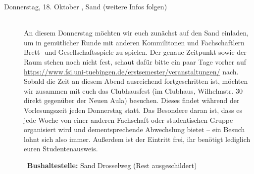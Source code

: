 \begin{description}
\item[Donnerstag, 18. Oktober \Jahr,  Sand (weitere Infos folgen)]\ \\
An diesem Donnerstag möchten wir euch zunächst auf den Sand einladen, um in gemütlicher Runde mit anderen Kommilitonen und Fachschaftlern Brett- und Gesellschaftsspiele zu spielen. Der genaue Zeitpunkt sowie der Raum stehen noch nicht fest, schaut dafür bitte ein paar Tage vorher auf \url{https://www.fsi.uni-tuebingen.de/erstsemester/veranstaltungen/} nach.\\ Sobald die Zeit an diesem Abend ausreichend fortgeschritten ist, möchten wir zusammen mit euch das Clubhausfest (im Clubhaus, Wilhelmstr. 30 direkt gegenüber der Neuen Aula) besuchen. Dieses findet während der Vorlesungszeit jeden Donnerstag statt. Das Besondere daran ist, dass es jede Woche von einer anderen Fachschaft oder studentischen Gruppe organisiert wird und dementsprechende Abwechslung bietet -- ein Besuch lohnt sich also immer. Außerdem ist der Eintritt frei, ihr benötigt lediglich euren Studentenausweis.

~\textbf{Bushaltestelle:} Sand Drosselweg (Rest ausgeschildert)

~\\

\end{description}
